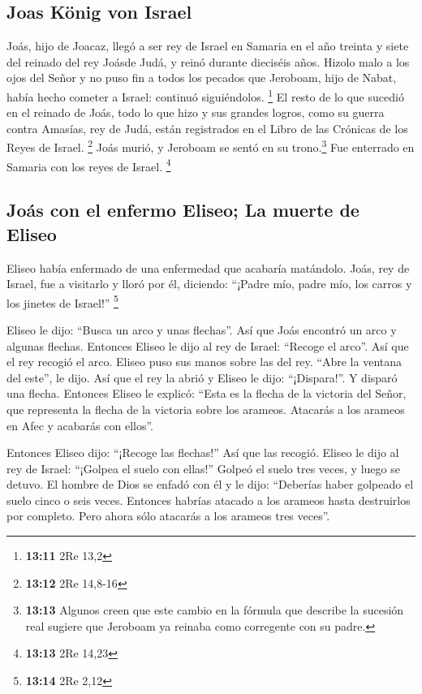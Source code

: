 \hypertarget{joas-kuxf6nig-von-israel}{%
\subsection{Joas König von Israel}\label{joas-kuxf6nig-von-israel}}

 Joás, hijo de Joacaz, llegó a ser rey de Israel en
Samaria en el año treinta y siete del reinado del rey Joásde Judá, y
reinó durante dieciséis años.  Hizolo malo a los ojos del
Señor y no puso fin a todos los pecados que Jeroboam, hijo de Nabat,
había hecho cometer a Israel: continuó siguiéndolos. \footnote{\textbf{13:11}
  2Re 13,2}  El resto de lo que sucedió en el reinado de
Joás, todo lo que hizo y sus grandes logros, como su guerra contra
Amasías, rey de Judá, están registrados en el Libro de las Crónicas de
los Reyes de Israel. \footnote{\textbf{13:12} 2Re 14,8-16}
 Joás murió, y Jeroboam se sentó en su trono.\footnote{\textbf{13:13}
  Algunos creen que este cambio en la fórmula que describe la sucesión
  real sugiere que Jeroboam ya reinaba como corregente con su padre.}
Fue enterrado en Samaria con los reyes de Israel. \footnote{\textbf{13:13}
  2Re 14,23}

\hypertarget{jouxe1s-con-el-enfermo-eliseo-la-muerte-de-eliseo}{%
\subsection{Joás con el enfermo Eliseo; La muerte de
Eliseo}\label{jouxe1s-con-el-enfermo-eliseo-la-muerte-de-eliseo}}

 Eliseo había enfermado de una enfermedad que acabaría
matándolo. Joás, rey de Israel, fue a visitarlo y lloró por él,
diciendo: ``¡Padre mío, padre mío, los carros y los jinetes de Israel!''
\footnote{\textbf{13:14} 2Re 2,12}

 Eliseo le dijo: ``Busca un arco y unas flechas''. Así
que Joás encontró un arco y algunas flechas.  Entonces
Eliseo le dijo al rey de Israel: ``Recoge el arco''. Así que el rey
recogió el arco. Eliseo puso sus manos sobre las del rey.
 ``Abre la ventana del este'', le dijo. Así que el rey la
abrió y Eliseo le dijo: ``¡Dispara!''. Y disparó una flecha. Entonces
Eliseo le explicó: ``Esta es la flecha de la victoria del Señor, que
representa la flecha de la victoria sobre los arameos. Atacarás a los
arameos en Afec y acabarás con ellos''.

 Entonces Eliseo dijo: ``¡Recoge las flechas!'' Así que
las recogió. Eliseo le dijo al rey de Israel: ``¡Golpea el suelo con
ellas!'' Golpeó el suelo tres veces, y luego se detuvo. 
El hombre de Dios se enfadó con él y le dijo: ``Deberías haber golpeado
el suelo cinco o seis veces. Entonces habrías atacado a los arameos
hasta destruirlos por completo. Pero ahora sólo atacarás a los arameos
tres veces''.

